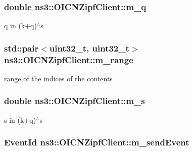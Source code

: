 \hypertarget{classns3_1_1OICNZipfClient_aa56cf1606f17a1753bb4b066f75d5dcc}{
\subsubsection[{m\-\_\-q}]{\setlength{\rightskip}{0pt plus 5cm}double ns3\-::\-O\-I\-C\-N\-Zipf\-Client\-::m\-\_\-q\hspace{0.3cm}{\ttfamily [private]}}}\label{classns3_1_1OICNZipfClient_aa56cf1606f17a1753bb4b066f75d5dcc}


q in (k+q)$^\wedge$s 

\hypertarget{classns3_1_1OICNZipfClient_a374afd9b3085995e5fc37befbc593925}{
\subsubsection[{m\-\_\-range}]{\setlength{\rightskip}{0pt plus 5cm}std\-::pair$<$uint32\-\_\-t, uint32\-\_\-t$>$ ns3\-::\-O\-I\-C\-N\-Zipf\-Client\-::m\-\_\-range\hspace{0.3cm}{\ttfamily [private]}}}\label{classns3_1_1OICNZipfClient_a374afd9b3085995e5fc37befbc593925}


range of the indices of the contents 

\hypertarget{classns3_1_1OICNZipfClient_a4bf5ef44d4ee8832da331827774bff10}{
\subsubsection[{m\-\_\-s}]{\setlength{\rightskip}{0pt plus 5cm}double ns3\-::\-O\-I\-C\-N\-Zipf\-Client\-::m\-\_\-s\hspace{0.3cm}{\ttfamily [private]}}}\label{classns3_1_1OICNZipfClient_a4bf5ef44d4ee8832da331827774bff10}


s in (k+q)$^\wedge$s 

\hypertarget{classns3_1_1OICNZipfClient_ae3d2dfdcf8327811fd5f2def89214b21}{
\subsubsection[{m\-\_\-send\-Event}]{\setlength{\rightskip}{0pt plus 5cm}Event\-Id ns3\-::\-O\-I\-C\-N\-Zipf\-Client\-::m\-\_\-send\-Event\hspace{0.3cm}{\ttfamily [private]}}}\label{classns3_1_1OICNZipfClient_ae3d2dfdcf8327811fd5f2def89214b21}


